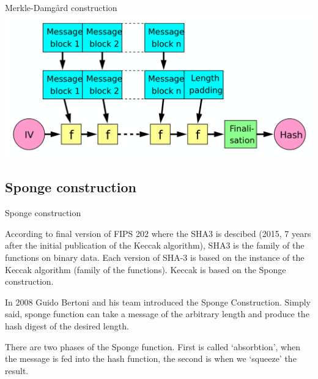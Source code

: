 \documentclass{beamer}
\begin{document}
\begin{frame}{Merkle-Damgård construction}
    \includegraphics[width=\textwidth]{Merkle-Damgard_hash_big.svg.png}
\end{frame}

\subsection{Sponge construction}

\begin{frame}{Sponge construction}
    \par According to final version of FIPS 202 where the SHA3 is descibed 
    (2015, 7 years after the initial publication of the Keccak algorithm),
    SHA3 is the family of the functions on binary data. Each version of SHA-3
    is based on the instance of the Keccak algorithm (family of the functions).
    Keccak is based on the Sponge construction.
    \newline \newline
    \pause
    \par In 2008 Guido Bertoni and his team introduced the Sponge Construction. Simply
    said, sponge function can take a message of the arbitrary length and
    produce the hash digest of the desired length.
    \newline \newline
    \pause
    \par There are two phases of the Sponge function. First is called `absorbtion',
    when the message is fed into the hash function, the second is when we
    `squeeze' the result.
\end{frame}
\end{document}

